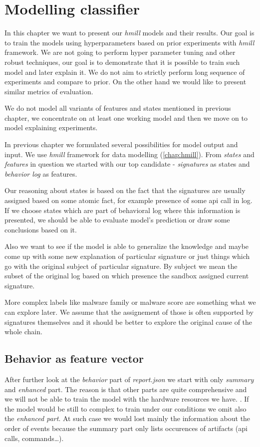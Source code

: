 \chapter{Modelling classifier} \label{chap:models}
In this chapter we want to present our \emph{hmill} models and their results. Our goal is to train the models using hyperparameters based on prior experiments with \emph{hmill} framework. We are not going to perform hyper parameter tuning and other robust techniques, our goal is to demonstrate that it is possible to train such model and later explain it. We do not aim to strictly perform long sequence of experiments and compare to prior. On the other hand we would like to present similar metrics of evaluation. 

We do not model all variants of features and states mentioned in previous chapter, we concentrate on at least one working model and then we move on to model explaining experiments.

In previous chapter we formulated several possibilities for model output and input. We use \emph{hmill} framework for data modelling (\ref{chap:hmill}). From \emph{states} and \emph{features} in question we started with our top candidate - \emph{signatures} as states and \emph{behavior log} as features. 

Our reasoning about states is based on the fact that the signatures are usually assigned based on some atomic fact, for example presence of some api call in log. If we choose states which are part of behavioral log where this information is presented, we should be able to evaluate model's prediction or draw some conclusions based on it. 

Also we want to see if the model is able to generalize the knowledge and maybe come up with some new explanation of particular signature or just things which go with the original subject of particular signature. By subject we mean the subset of the original log based on which presence the sandbox assigned current signature.

More complex labels like malware family or malware score are something what we can explore later. We assume that the assignement of those is often supported by signatures themselves and it should be better to explore the original cause of the whole chain.

\section{Behavior as feature vector}
After further look at the \emph{behavior} part of \emph{report.json} we start with only \emph{summary} and \emph{enhanced} part. The reason is that other parts are quite comprehensive and we will not be able to train the model with the hardware resources we have. . If the model would be still to complex to train under our conditions we omit also the \emph{enhanced part}. At such case we would lost mainly the information about the order of events because the summary part only lists occurences of artifacts (api calls, commands\dots).

